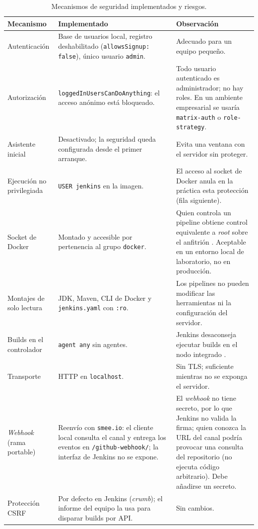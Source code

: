 \documentclass[11pt,a4paper]{article}
\begin{document}
\begin{table}[H]
\centering
\small
\begin{tabularx}{\textwidth}{@{}P{3.4cm} L L@{}}
\toprule
\textbf{Mecanismo} & \textbf{Implementado} & \textbf{Observación}\\
\midrule
Autenticación & Base de usuarios local, registro deshabilitado (\texttt{allowsSignup: false}),
único usuario \texttt{admin}. & Adecuado para un equipo pequeño.\\
Autorización & \texttt{loggedInUsersCanDoAnything}: el acceso anónimo está bloqueado. & Todo usuario
autenticado es administrador; no hay roles. En un ambiente empresarial se usaría
\texttt{matrix-auth} o \texttt{role-strategy}.\\
Asistente inicial & Desactivado; la seguridad queda configurada desde el primer arranque. & Evita
una ventana con el servidor sin proteger.\\
Ejecución no privilegiada & \texttt{USER jenkins} en la imagen. & El acceso al socket de Docker
anula en la práctica esta protección (fila siguiente).\\
Socket de Docker & Montado y accesible por pertenencia al grupo \texttt{docker}. & Quien controla
un pipeline obtiene control equivalente a \emph{root} sobre el anfitrión \cite{docker-socket}.
Aceptable en un entorno local de laboratorio, no en producción.\\
Montajes de solo lectura & JDK, Maven, CLI de Docker y \texttt{jenkins.yaml} con \texttt{:ro}. &
Los pipelines no pueden modificar las herramientas ni la configuración del servidor.\\
Builds en el controlador & \texttt{agent any} sin agentes. & Jenkins desaconseja ejecutar builds en
el nodo integrado \cite{jenkins-security}.\\
Transporte & HTTP en \texttt{localhost}. & Sin TLS; suficiente mientras no se exponga el servidor.\\
\emph{Webhook} (rama portable) & Reenvío con \texttt{smee.io}: el cliente local consulta el canal y
entrega los eventos en \texttt{/github-webhook/}; la interfaz de Jenkins no se expone. & El
\emph{webhook} no tiene secreto, por lo que Jenkins no valida la firma; quien conozca la URL del canal
podría provocar una consulta del repositorio (no ejecuta código arbitrario). Debe añadirse un
secreto.\\
Protección CSRF & Por defecto en Jenkins (\emph{crumb}); el informe del equipo la usa para
disparar builds por API. & Sin cambios.\\
\bottomrule
\end{tabularx}
\caption{Mecanismos de seguridad implementados y riesgos.}
\label{tab:seguridad}
\end{table}
\end{document}
